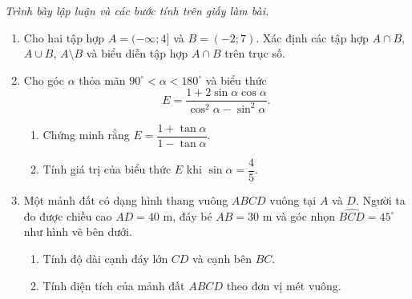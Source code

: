 \documentclass[12pt,a4paper]{article}
\newcommand{\parttitle}[1]{\par\vspace{3pt}{\large\bfseries\color{ink}#1}\par\vspace{2pt}}
\begin{document}
\par\vspace{8pt}
\parttitle{PHẦN IV. Tự luận}
\textit{Trình bày lập luận và các bước tính trên giấy làm bài.}
\begin{enumerate}
\item Cho hai tập hợp $A = (-\infty; 4]$ và $B = (-2; 7)$.
Xác định các tập hợp $A \cap B$, $A \cup B$, $A \setminus B$ và biểu diễn tập hợp $A \cap B$ trên trục số.
\item Cho góc $\alpha$ thỏa mãn $90^\circ < \alpha < 180^\circ$ và biểu thức
\[
E = \frac{1 + 2\sin\alpha\cos\alpha}{\cos^2\alpha - \sin^2\alpha}.
\]
\begin{enumerate}
\item Chứng minh rằng $E = \dfrac{1 + \tan\alpha}{1 - \tan\alpha}$.
\item Tính giá trị của biểu thức $E$ khi $\sin\alpha = \dfrac{4}{5}$.
\end{enumerate}
\item Một mảnh đất có dạng hình thang vuông $ABCD$ vuông tại $A$ và $D$. Người ta đo được chiều cao $AD = 40\text{ m}$, đáy bé $AB = 30\text{ m}$ và góc nhọn $\widehat{BCD} = 45^\circ$ như hình vẽ bên dưới.
\begin{enumerate}
\item Tính độ dài cạnh đáy lớn $CD$ và cạnh bên $BC$.
\item Tính diện tích của mảnh đất $ABCD$ theo đơn vị mét vuông.
\end{enumerate}
\begin{center}
\end{center}
\end{enumerate}
\end{document}
